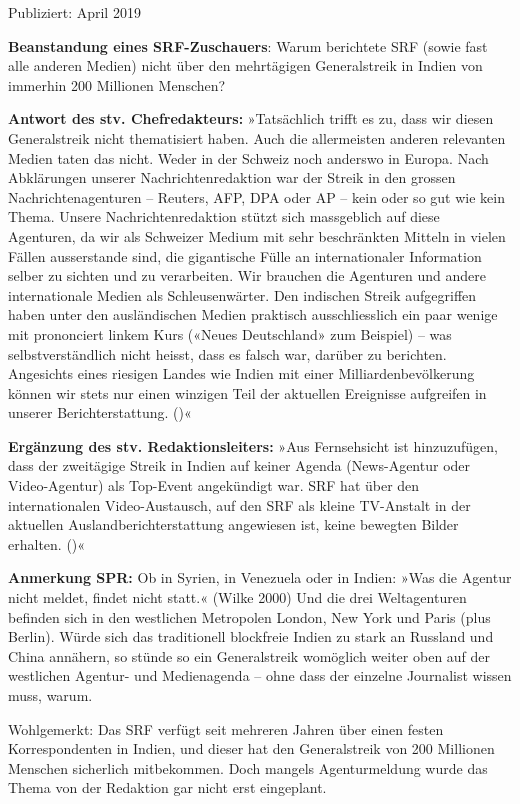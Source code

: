 Publiziert: April 2019

\textbf{Beanstandung eines SRF-Zuschauers}: Warum berichtete SRF (sowie
fast alle anderen Medien) nicht über den mehrtägigen Generalstreik in
Indien von immerhin 200 Millionen Menschen?

\textbf{Antwort des stv. Chefredakteurs:} »Tatsächlich trifft es zu,
dass wir diesen Generalstreik nicht thematisiert haben. Auch die
allermeisten anderen relevanten Medien taten das nicht. Weder in der
Schweiz noch anderswo in Europa. Nach Abklärungen unserer
Nachrichten­redaktion war der Streik in den grossen Nachrichtenagenturen
-- Reuters, AFP, DPA oder AP -- kein oder so gut wie kein Thema. Unsere
Nachrichten­redaktion stützt sich massgeblich auf diese Agenturen, da
wir als Schweizer Medium mit sehr beschränkten Mitteln in vielen Fällen
ausserstande sind, die gigantische Fülle an internationaler Information
selber zu sichten und zu verarbeiten. Wir brauchen die Agenturen und
andere internationale Medien als Schleusenwärter. Den indischen Streik
aufgegriffen haben unter den ausländischen Medien praktisch
ausschliesslich ein paar wenige mit prononciert linkem Kurs («Neues
Deutschland» zum Beispiel) -- was selbstverständlich nicht heisst, dass
es falsch war, darüber zu berichten. Angesichts eines riesigen Landes
wie Indien mit einer Milliarden­bevölkerung können wir stets nur einen
winzigen Teil der aktuellen Ereignisse aufgreifen in unserer
Berichterstattung. ()«

\textbf{Ergänzung des stv. Redaktionsleiters:} »Aus Fernsehsicht ist
hinzuzufügen, dass der zweitägige Streik in Indien auf keiner Agenda
(News-Agentur oder Video-Agentur) als Top-Event angekündigt war. SRF hat
über den internationalen Video-Austausch, auf den SRF als kleine
TV-Anstalt in der aktuellen Ausland­bericht­erstattung angewiesen ist,
keine bewegten Bilder erhalten. ()«

\textbf{Anmerkung SPR:} Ob in Syrien, in Venezuela oder in Indien: »Was
die Agentur nicht meldet, findet nicht statt.« (Wilke 2000) Und die drei
Weltagenturen befinden sich in den westlichen Metropolen London, New
York und Paris (plus Berlin). Würde sich das traditionell blockfreie
Indien zu stark an Russland und China annähern, so stünde so ein
Generalstreik womöglich weiter oben auf der westlichen Agentur- und
Medienagenda -- ohne dass der einzelne Journalist wissen muss, warum.

Wohlgemerkt: Das SRF verfügt seit mehreren Jahren über einen festen
Korrespondenten in Indien, und dieser hat den Generalstreik von 200
Millionen Menschen sicherlich mitbekommen. Doch mangels Agentur­meldung
wurde das Thema von der Redaktion gar nicht erst eingeplant.

